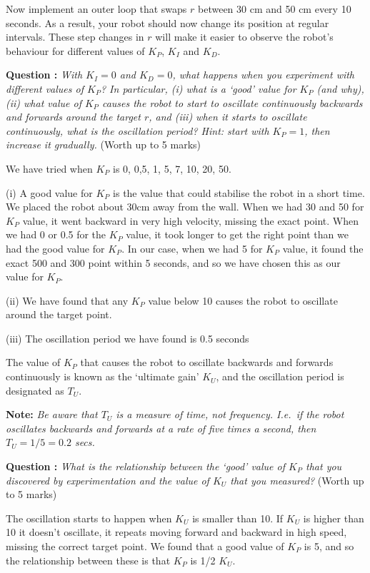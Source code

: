\documentclass[hidelinks,a4paper,11pt]{article}
\newcounter{question}
\newcommand\myq{\refstepcounter{question}\thequestion}
\begin{document}
	Now implement an outer loop that swaps $r$ between 30 cm and 50 cm every 10 seconds.  As a result, your robot should now change its position at regular intervals.  These step changes in $r$ will make it easier to observe the robot's behaviour for different values of $K_P$, $K_I$ and $K_D$.
	
	{\bfseries Question \myq:}  \emph{With $K_I=0$ and $K_D=0$, what happens when you experiment with different values of $K_P$?  In particular, (i) what is a `good' value for $K_P$ (and why), (ii) what value of $K_P$ causes the robot to start to oscillate continuously backwards and forwards around the target $r$, and (iii) when it starts to oscillate continuously, what is the oscillation period?  Hint: start with $K_P =1$, then increase it gradually.} (Worth up to 5 marks)\\
	\begin{mdframed}
		We have tried when $K_P$ is 0, 0,5, 1, 5, 7, 10, 20, 50.
		
		(i) A good value for $K_P$ is the value that could stabilise the robot in a short time. We placed the robot about 30cm away from the wall. When we had 30 and 50 for $K_P$ value, it went backward in very high velocity, missing the exact point. When we had 0 or 0.5 for the $K_P$ value, it took longer to get the right point than we had the good value for $K_P$. In our case, when we had 5 for $K_P$ value, it found the exact 500 and 300 point within 5 seconds, and so we have chosen this as our value for $K_P$.
		
		(ii) We have found that any  $K_P$ value below 10 causes the robot to oscillate around the target point.
		
		(iii) The oscillation period we have found is 0.5 seconds
	\end{mdframed}
	\vspace*{\baselineskip}
	
	The value of $K_P$ that causes the robot to oscillate backwards and forwards continuously is known as the `ultimate gain' $K_U$, and the oscillation period is designated as $T_U$.
	
	{\bfseries Note:}  \emph{Be aware that $T_U$ is a measure of time, not frequency.  I.e.\ if the robot oscillates backwards and forwards at a rate of five times a second, then $T_U=1/5=0.2$ secs.}
	
	{\bfseries Question \myq:}  \emph{What is the relationship between the `good' value of $K_P$ that you discovered by experimentation and the value of $K_U$ that you measured?} (Worth up to 5 marks)\\
	\begin{mdframed}
		
		The oscillation starts to happen when $K_U$ is smaller than 10. If $K_U$ is higher than 10 it doesn't oscillate, it repeats moving forward and backward in high speed, missing the correct target point.
		We found that a good value of $K_P$ is 5, and so the relationship between these is that $K_P$ is 1/2 $K_U$.
	\end{mdframed}
	\vspace*{\baselineskip}
	
\end{document}
